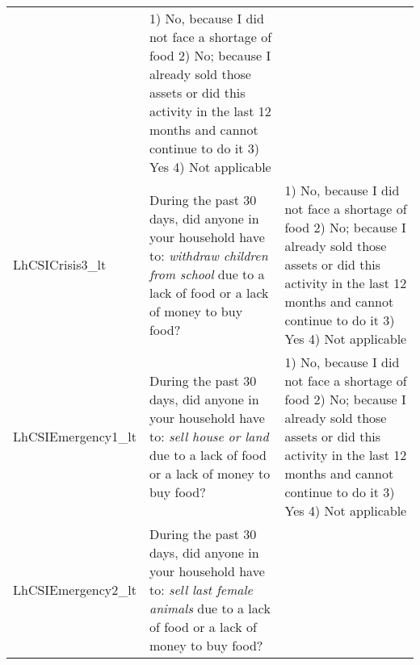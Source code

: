 \documentclass[
]{article}
\begin{document}
\begin{longtable}[]{@{}lll@{}}
\begin{minipage}[t]{0.49\columnwidth}
\end{minipage} & \begin{minipage}[t]{0.27\columnwidth}\raggedright
1) No, because I did not face a shortage of food 2) No; because I already sold those assets or did this activity in the last 12 months and cannot continue to do it 3) Yes 4) Not applicable\strut
\end{minipage}\tabularnewline
\begin{minipage}[t]{0.15\columnwidth}\raggedright
LhCSICrisis3\_lt\strut
\end{minipage} & \begin{minipage}[t]{0.49\columnwidth}\raggedright
During the past 30 days, did anyone in your household have to: \emph{withdraw children from school} due to a lack of food or a lack of money to buy food?\strut
\end{minipage} & \begin{minipage}[t]{0.27\columnwidth}\raggedright
1) No, because I did not face a shortage of food 2) No; because I already sold those assets or did this activity in the last 12 months and cannot continue to do it 3) Yes 4) Not applicable\strut
\end{minipage}\tabularnewline
\begin{minipage}[t]{0.15\columnwidth}\raggedright
LhCSIEmergency1\_lt\strut
\end{minipage} & \begin{minipage}[t]{0.49\columnwidth}\raggedright
During the past 30 days, did anyone in your household have to: \emph{sell house or land} due to a lack of food or a lack of money to buy food?\strut
\end{minipage} & \begin{minipage}[t]{0.27\columnwidth}\raggedright
1) No, because I did not face a shortage of food 2) No; because I already sold those assets or did this activity in the last 12 months and cannot continue to do it 3) Yes 4) Not applicable\strut
\end{minipage}\tabularnewline
\begin{minipage}[t]{0.15\columnwidth}\raggedright
LhCSIEmergency2\_lt\strut
\end{minipage} & \begin{minipage}[t]{0.49\columnwidth}\raggedright
During the past 30 days, did anyone in your household have to: \emph{sell last female animals} due to a lack of food or a lack of money to buy food?\strut
\end{minipage} & \begin{minipage}[t]{0.27\columnwidth}\raggedright

\end{minipage}
\end{longtable}
\end{document}
